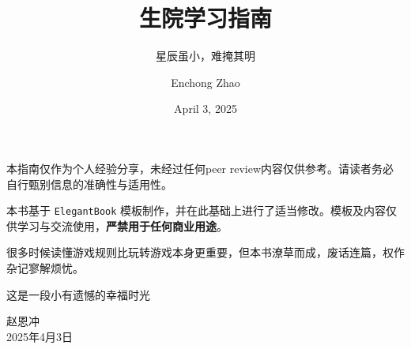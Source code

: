 \documentclass[lang=cn,10pt]{elegant}
\title{生院学习指南}
\subtitle{星辰虽小，难掩其明}
\author{Enchong Zhao}
\institute{USTC生命科学学院}
\date{April 3, 2025}
\begin{document}
\maketitle
\frontmatter
\tableofcontents
\mainmatter

\newpage

\begin{center}

    \begin{tcolorbox}[colback=gray!5!white, colframe=red!80!black,
        width=0.8\textwidth, title=说明, sharp corners, box align=center]
        本指南仅作为个人经验分享，未经过任何peer review内容仅供参考。请读者务必自行甄别信息的准确性与适用性。

        本书基于 \texttt{ElegantBook} 模板制作，并在此基础上进行了适当修改。模板及内容仅供学习与交流使用，\textbf{严禁用于任何商业用途}。

        很多时候读懂游戏规则比玩转游戏本身更重要，但本书潦草而成，废话连篇，权作杂记寥解烦忧。
    \end{tcolorbox}
\end{center}

\newpage

\thispagestyle{fancy} %


\begin{mdframed}[
    linewidth=0.7pt,
    linecolor=gold!60,
    backgroundcolor=gold!5
]
\noindent

\vspace*{7cm}
\begin{center}

\LARGE 这是一段小有遗憾的幸福时光

\end{center}

\vspace*{11.1cm}

\begin{flushright}
    \textcolor{gray!50}{\scriptsize 赵恩冲} \\
    \textcolor{gray!50}{\scriptsize 2025年4月3日}
\end{flushright}
    
\end{mdframed}








\end{document}
